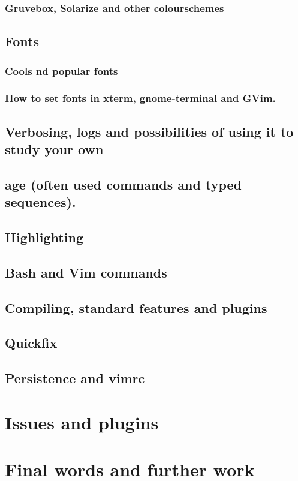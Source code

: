\documentclass{article}
\begin{document}
\subsubsection{Gruvebox, Solarize and other colourschemes}
\subsection{Fonts}
\subsubsection{Cools nd popular fonts}
\subsubsection{How to set fonts in xterm, gnome-terminal and GVim.}
\subsection{Verbosing, logs and possibilities of using it to study your own}
\subsection{age (often used commands and typed sequences).}
\subsection{Highlighting}
\subsection{Bash and Vim commands}
\subsection{Compiling, standard features and plugins}
\subsection{Quickfix}
\subsection{Persistence and vimrc}
\section{Issues and plugins}\label{issues}

\section{Final words and further work}
\end{document}
